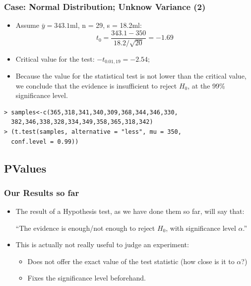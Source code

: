 \documentclass[10pt]{beamer}
\begin{document}
\begin{frame}
  \frametitle{Case: Normal Distribution; Unknow Variance (2)}

  \begin{itemize}
  \item Assume $\bar{y} = 343.1$ml, n = 29, s = 18.2ml:
    \begin{equation*}
      t_0 = \frac{343.1 - 350}{18.2/\sqrt{20}} = -1.69
    \end{equation*}
  \item Critical value for the test: $-t_{0.01,19} = -2.54;$\\

  \item Because the value for the statistical test is not lower than
    the critical value, we conclude that the evidence is insufficient
    to reject $H_0$, at the 99\% significance level.    
  \end{itemize}

  \begin{block}{}
    {\smaller
\begin{verbatim}
> samples<-c(365,318,341,340,309,368,344,346,330,
  382,346,338,328,334,349,358,365,318,342)
> (t.test(samples, alternative = "less", mu = 350,
  conf.level = 0.99))
\end{verbatim}}
  \end{block}
\end{frame}

\subsection{PValues}

\begin{frame}
  \frametitle{Our Results so far}
  \begin{itemize}
  \item The result of a Hypothesis test, as we have done them so far, will say that:
    \begin{block}{}
      ``The evidence is enough/not enough to reject $H_0$, with
      significance level $\alpha$.''
    \end{block}
    \medskip
  \item This is actually not really useful to judge an experiment:
    \begin{itemize}
    \item Does not offer the exact value of the test statistic (how close is it to $\alpha$?)
    \item Fixes the significance level beforehand.
    \end{itemize}
  \end{itemize}
\end{frame}
\end{document}
